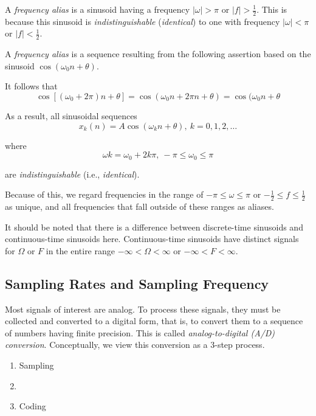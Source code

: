 \begin{definition}\label{def:Frequency Alias}
  A \emph{frequency alias} is a sinusoid having a frequency $\lvert \omega \rvert > \pi$ or $\lvert f \rvert > \frac{1}{2}$.
  This is because this sinusoid is \emph{indistinguishable} (\emph{identical}) to one with  frequency $\lvert \omega \rvert < \pi$ or $\lvert f \rvert < \frac{1}{2}$.
  \newline
  \begin{blackbox}
    A \emph{frequency alias} is a sequence resulting from the
    following assertion based on the sinusoid
    $\cos(\omega_{0}n + \theta)$.

    It follows that
    \begin{equation*}
      \cos \left[ \left( \omega_{0} + 2\pi \right)n + \theta \right] = \cos \left( \omega_{0}n + 2\pi n + \theta \right) = \cos (\omega_{0}n + \theta
    \end{equation*}

    As a result, all sinusoidal sequences
    \begin{equation*}
      x_{k}(n) = A \cos (\omega_{k}n + \theta) , \> k=0, 1, 2, \ldots
    \end{equation*}

    where
    \begin{equation*}
      \omega k = \omega_{0} + 2k \pi , \> -\pi \leq \omega_{0} \leq \pi
    \end{equation*}

    are \emph{indistinguishable} (i.e., \emph{identical}). \newline
  \end{blackbox}

  Because of this, we regard frequencies in the range of $-\pi \leq \omega \leq \pi$ or $-\frac{1}{2} \leq f \leq \frac{1}{2}$ as unique, and all frequencies that fall outside of these ranges as aliases.

  \begin{remark}
    It should be noted that there is a difference between discrete-time sinusoids and continuous-time sinusoids here.
    Continuous-time sinusoids have distinct signals for $\Omega$ or $F$ in the entire range $-\infty < \Omega < \infty$ or $-\infty < F < \infty$.
  \end{remark}
\end{definition}

\subsection{Sampling Rates and Sampling Frequency}\label{subsec:Sampling Rates and Frequency}
Most signals of interest are analog.
To process these signals, they must be collected and converted to a digital form, that is, to convert them to a sequence of numbers having finite precision.
This is called \emph{analog-to-digital (A/D) conversion}.
Conceptually, we view this conversion as a 3-step process.
\begin{enumerate}[noitemsep]
\item Sampling
\item {}
\item Coding
\end{enumerate}

